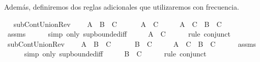 \begin{isabellebody}
\begin{isamarkuptext}
  Además, definiremos dos reglas adicionales que utilizaremos con frecuencia.%
\end{isamarkuptext}\isamarkuptrue%
\ \isanewline
{}\isamarkupfalse%
\ subContUnionRev{}{\isacharcolon}\ \isanewline
\ \ \ {\isachardoublequoteopen}A\ {\isasymunion}\ B\ {\isasymsubseteq}\ C{\isachardoublequoteclose}\ \isanewline
\ \ \ \ \ {\isachardoublequoteopen}A\ {\isasymsubseteq}\ C{\isachardoublequoteclose}\isanewline
%
\isadelimproof
%
\endisadelimproof
%
\isatagproof
{}\isamarkupfalse%
\ {\isacharminus}\isanewline
\ \ \isamarkupfalse%
\ {\isachardoublequoteopen}A\ {\isasymsubseteq}\ C\ {\isasymand}\ B\ {\isasymsubseteq}\ C{\isachardoublequoteclose}\isanewline
\ \ \ \ \isamarkupfalse%
\ assms\isanewline
\ \ \ \ \isamarkupfalse%
\ {\isacharparenleft}simp\ only{\isacharcolon}\ sup{\isachardot}bounded{\isacharunderscore}iff{\isacharparenright}\isanewline
\ \ \isamarkupfalse%
\ \isamarkupfalse%
\ {\isachardoublequoteopen}A\ {\isasymsubseteq}\ C{\isachardoublequoteclose}\isanewline
\ \ \ \ \isamarkupfalse%
\ {\isacharparenleft}rule\ conjunct{}{\isacharparenright}\isanewline
{}\isamarkupfalse%
%
\endisatagproof
{\isafoldproof}%
%
\isadelimproof
\isanewline
%
\endisadelimproof
\isanewline
{}\isamarkupfalse%
\ subContUnionRev{}{\isacharcolon}\ \isanewline
\ \ \ {\isachardoublequoteopen}A\ {\isasymunion}\ B\ {\isasymsubseteq}\ C{\isachardoublequoteclose}\ \isanewline
\ \ \ \ \ {\isachardoublequoteopen}B\ {\isasymsubseteq}\ C{\isachardoublequoteclose}\isanewline
%
\isadelimproof
%
\endisadelimproof
%
\isatagproof
{}\isamarkupfalse%
\ {\isacharminus}\isanewline
\ \ \isamarkupfalse%
\ {\isachardoublequoteopen}A\ {\isasymsubseteq}\ C\ {\isasymand}\ B\ {\isasymsubseteq}\ C{\isachardoublequoteclose}\isanewline
\ \ \ \ \isamarkupfalse%
\ assms\isanewline
\ \ \ \ \isamarkupfalse%
\ {\isacharparenleft}simp\ only{\isacharcolon}\ sup{\isachardot}bounded{\isacharunderscore}iff{\isacharparenright}\isanewline
\ \ \isamarkupfalse%
\ \isamarkupfalse%
\ {\isachardoublequoteopen}B\ {\isasymsubseteq}\ C{\isachardoublequoteclose}\isanewline
\ \ \ \ \isamarkupfalse%
\ {\isacharparenleft}rule\ conjunct{}{\isacharparenright}\isanewline
{}\isamarkupfalse%
%

\end{isabellebody}
